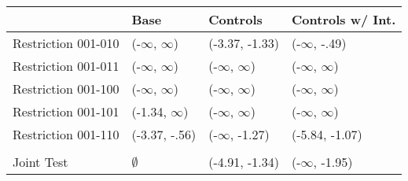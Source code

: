 \begin{tabular}{llll}
\toprule
{} &           Base &        Controls & Controls w/ Int. \\
\midrule
Restriction 001-010 &      (-$\infty$, $\infty$) &  (-3.37, -1.33) &      (-$\infty$, -.49) \\
Restriction 001-011 &      (-$\infty$, $\infty$) &       (-$\infty$, $\infty$) &        (-$\infty$, $\infty$) \\
Restriction 001-100 &      (-$\infty$, $\infty$) &       (-$\infty$, $\infty$) &        (-$\infty$, $\infty$) \\
Restriction 001-101 &    (-1.34, $\infty$) &       (-$\infty$, $\infty$) &        (-$\infty$, $\infty$) \\
Restriction 001-110 &  (-3.37, -.56) &    (-$\infty$, -1.27) &   (-5.84, -1.07) \\
\hline\\Joint Test  &         $\emptyset$ &  (-4.91, -1.34) &     (-$\infty$, -1.95) \\
\bottomrule
\end{tabular}
